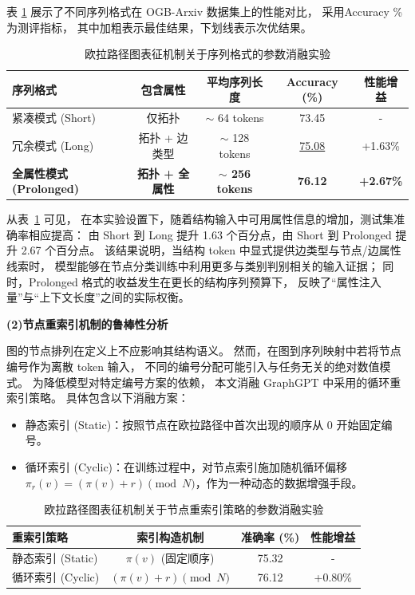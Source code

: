 表 \ref{tab:ablation_format} 展示了不同序列格式在 OGB-Arxiv 数据集上的性能对比，
采用Accuracy \%为测评指标，
其中加粗表示最佳结果，下划线表示次优结果。

\begin{table}[htbp]
  \centering
  \small
  \caption{欧拉路径图表征机制关于序列格式的参数消融实验}
  \label{tab:ablation_format}
  \setlength{\tabcolsep}{10pt}
  \renewcommand{\arraystretch}{1.2}
  \begin{tabular}{lcccc}
    \toprule
    \textbf{序列格式} & \textbf{包含属性} & \textbf{平均序列长度} & \textbf{Accuracy (\%)} & \textbf{性能增益} \\
    \midrule
    紧凑模式 (Short) & 仅拓扑 & $\sim$ 64 tokens & 73.45 & - \\
    冗余模式 (Long) & 拓扑 + 边类型 & $\sim$ 128 tokens & \underline{75.08} & +1.63\% \\
    \textbf{全属性模式 (Prolonged)} & \textbf{拓扑 + 全属性} & \textbf{$\sim$ 256 tokens} & \textbf{76.12} & \textbf{+2.67\%} \\
    \bottomrule
  \end{tabular}
\end{table}

从表~\ref{tab:ablation_format} 可见，
在本实验设置下，随着结构输入中可用属性信息的增加，测试集准确率相应提高：
由 Short 到 Long 提升 1.63 个百分点，由 Short 到 Prolonged 提升 2.67 个百分点。
该结果说明，当结构 token 中显式提供边类型与节点/边属性线索时，
模型能够在节点分类训练中利用更多与类别判别相关的输入证据；
同时，Prolonged 格式的收益发生在更长的结构序列预算下，
反映了“属性注入量”与“上下文长度”之间的实际权衡。

\textbf{(2)节点重索引机制的鲁棒性分析}

图的节点排列在定义上不应影响其结构语义。
然而，在图到序列映射中若将节点编号作为离散 token 输入，
不同的编号分配可能引入与任务无关的绝对数值模式。
为降低模型对特定编号方案的依赖，
本文消融 GraphGPT\cite{Zhao2023GraphGPTGP} 中采用的循环重索引策略。
具体包含以下消融方案：
\begin{itemize}
    \item {静态索引 (Static)}：按照节点在欧拉路径中首次出现的顺序从 0 开始固定编号。
    \item {循环索引 (Cyclic)}：在训练过程中，对节点索引施加随机循环偏移 $\pi_r(v) = (\pi(v) + r) \pmod N$，作为一种动态的数据增强手段。
\end{itemize}

\begin{table}[htbp]
  \centering
  \caption{欧拉路径图表征机制关于节点重索引策略的参数消融实验}
  \label{tab:ablation_reindexing}
  \begin{tabular}{lccc}
    \toprule
    重索引策略 & 索引构造机制 & 准确率 (\%) & 性能增益 \\
    \midrule
    静态索引 (Static) & $\pi(v)$ (固定顺序) & 75.32 & - \\
    循环索引 (Cyclic) & $(\pi(v) + r) \pmod N$ & {76.12} & {+0.80\%} \\
    \bottomrule
  \end{tabular}
  \vspace{0.2cm}
\end{table}

